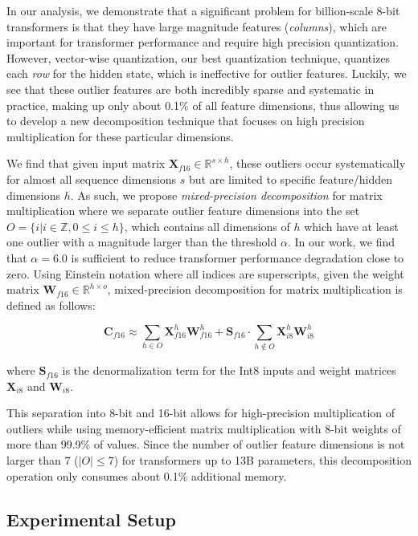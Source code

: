 In our analysis, we demonstrate that a significant problem for billion-scale 8-bit transformers is that they have large magnitude features ({\it columns}), which are important for transformer performance and require high precision quantization. However, vector-wise quantization, our best quantization technique, quantizes each {\it row} for the hidden state, which is ineffective for outlier features. Luckily, we see that these outlier features are both incredibly sparse and systematic in practice, making up only about 0.1\% of all feature dimensions, thus allowing us to develop a new decomposition technique that focuses on high precision multiplication for these particular dimensions.

We find that given input matrix $\mathbf{X}_{f16}\in \mathbb{R}^{s\times h}$, these outliers occur systematically for almost all sequence dimensions $s$ but are limited to specific feature/hidden dimensions $h$. As such, we propose {\it mixed-precision decomposition} for matrix multiplication where we separate outlier feature dimensions into the set ${O =\{i| i\in \mathbb{Z}, 0 \leq i \leq h\}}$, which contains all dimensions of $h$ which have at least one outlier with a magnitude larger than the threshold $\alpha$. In our work, we find that $\alpha=6.0$ is sufficient to reduce transformer performance degradation close to zero. Using Einstein notation where all indices are superscripts, given the weight matrix $\mathbf{W}_{f16}\in \mathbb{R}^{h\times o}$, mixed-precision decomposition for matrix multiplication is defined as follows:

\begin{equation}
    \mathbf{C}_{f16} \approx \sum\limits_{h\in O} \mathbf{X}_{f16}^h \mathbf{W}_{f16}^h + \mathbf{S}_{f16} \cdot  \sum\limits_{h\not\in O} \mathbf{X}_{i8}^h \mathbf{W}_{i8}^h
\end{equation}

where $\mathbf{S}_{f16}$ is the denormalization term for the Int8 inputs and weight matrices $\mathbf{X}_{i8}$ and $\mathbf{W}_{i8}$.

This separation into 8-bit and 16-bit allows for high-precision multiplication of outliers while using memory-efficient matrix multiplication with 8-bit weights of more than 99.9\% of values. Since the number of outlier feature dimensions is not larger than 7 ($|O|\leq7$) for transformers up to 13B parameters, this decomposition operation only consumes about 0.1\% additional memory.

\subsection{Experimental Setup}

